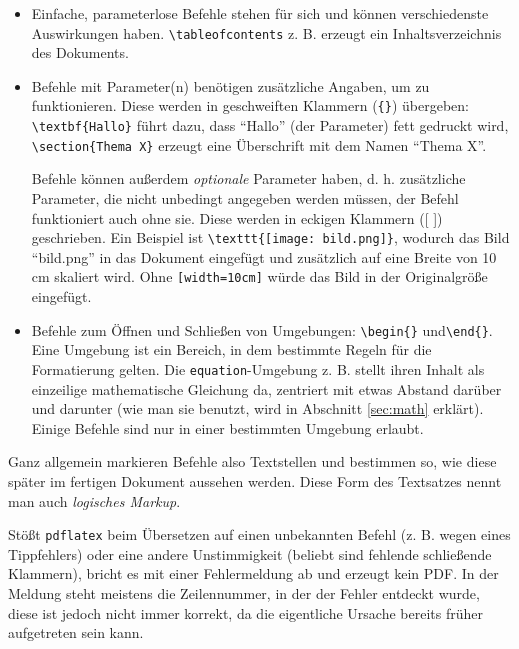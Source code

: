 \documentclass[titlepage, parskip=full*]{scrartcl}
\begin{document}
\begin{itemize}
\item Einfache, parameterlose Befehle stehen für sich und können verschiedenste Auswirkungen haben. \lstinline|\tableofcontents| z. B. erzeugt ein Inhaltsverzeichnis des Dokuments.

\item Befehle mit Parameter(n) benötigen zusätzliche Angaben, um zu funktionieren. Diese werden in geschweiften Klammern (\verb|{}|) übergeben: \lstinline|\textbf{Hallo}| führt dazu, dass \enquote{Hallo} (der Parameter) fett gedruckt wird, \lstinline|\section{Thema X}| erzeugt eine Überschrift mit dem Namen \enquote{Thema X}.

Befehle können außerdem \emph{optionale} Parameter haben, d. h. zusätzliche Parameter, die nicht unbedingt angegeben werden müssen, der Befehl funktioniert auch ohne sie. Diese werden in eckigen Klammern ([ ]) geschrieben. Ein Beispiel ist \lstinline|\texttt{[image: bild.png]}|, wodurch das Bild \enquote{bild.png} in das Dokument eingefügt und zusätzlich auf eine Breite von 10\,cm skaliert wird. Ohne \texttt{[width=10cm]} würde das Bild in der Originalgröße eingefügt.

\item Befehle zum Öffnen und Schließen von Umgebungen: \lstinline|\begin{}| und\lstinline|\end{}|. Eine Umgebung ist ein Bereich, in dem bestimmte Regeln für die Formatierung gelten. Die \texttt{equation}-Umgebung z. B. stellt ihren Inhalt als einzeilige mathematische Gleichung da, zentriert mit etwas Abstand darüber und darunter (wie man sie benutzt, wird in Abschnitt \ref{sec:math} erklärt). Einige Befehle sind nur in einer bestimmten Umgebung erlaubt.
\end{itemize}

Ganz allgemein markieren Befehle also Textstellen und bestimmen so, wie diese später im fertigen Dokument aussehen werden. Diese Form des Textsatzes nennt man auch \emph{logisches Markup}.

Stößt \texttt{pdflatex} beim Übersetzen auf einen unbekannten Befehl (z. B. wegen eines Tippfehlers) oder eine andere Unstimmigkeit (beliebt sind fehlende schließende Klammern), bricht es mit einer Fehlermeldung ab und erzeugt kein PDF. In der Meldung steht meistens die Zeilennummer, in der der Fehler entdeckt wurde, diese ist jedoch nicht immer korrekt, da die eigentliche Ursache bereits früher aufgetreten sein kann.
\end{document}
